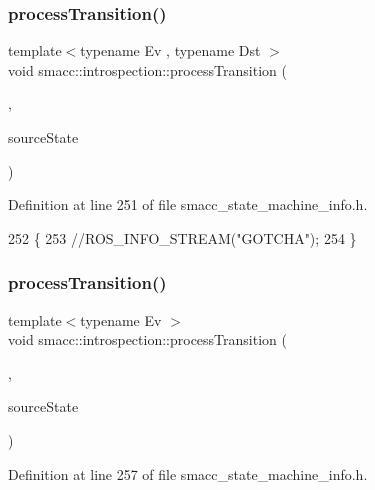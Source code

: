 \subsubsection{\texorpdfstring{process\+Transition()}{processTransition()}\hspace{0.1cm}{\footnotesize\ttfamily [3/4]}}
{\footnotesize\ttfamily template$<$typename Ev , typename Dst $>$ \\
void smacc\+::introspection\+::process\+Transition (\begin{DoxyParamCaption}\item[{statechart\+::transition$<$ Ev, Dst $>$ $\ast$}]{,  }\item[{std\+::shared\+\_\+ptr$<$ \hyperlink{classsmacc_1_1introspection_1_1SmaccStateInfo}{Smacc\+State\+Info} $>$ \&}]{source\+State }\end{DoxyParamCaption})}



Definition at line 251 of file smacc\+\_\+state\+\_\+machine\+\_\+info.\+h.


\begin{DoxyCode}
252 \{
253     \textcolor{comment}{//ROS\_INFO\_STREAM("GOTCHA");}
254 \}
\end{DoxyCode}
\mbox{\label{namespacesmacc_1_1introspection_a25f60bf498ae9f3d0324ed1b84ecbae4}} 
\subsubsection{\texorpdfstring{process\+Transition()}{processTransition()}\hspace{0.1cm}{\footnotesize\ttfamily [4/4]}}
{\footnotesize\ttfamily template$<$typename Ev $>$ \\
void smacc\+::introspection\+::process\+Transition (\begin{DoxyParamCaption}\item[{statechart\+::custom\+\_\+reaction$<$ Ev $>$ $\ast$}]{,  }\item[{std\+::shared\+\_\+ptr$<$ \hyperlink{classsmacc_1_1introspection_1_1SmaccStateInfo}{Smacc\+State\+Info} $>$ \&}]{source\+State }\end{DoxyParamCaption})}



Definition at line 257 of file smacc\+\_\+state\+\_\+machine\+\_\+info.\+h.



